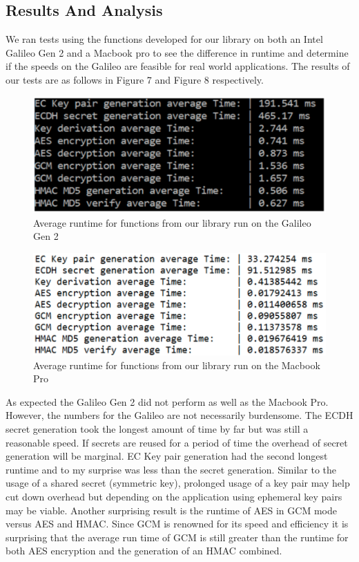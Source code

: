 \subsection{Results And Analysis}
	We ran tests using the functions developed for our library on both an Intel Galileo Gen 2 and a Macbook pro to see the difference in runtime and determine if the speeds on the Galileo are feasible for real world applications. The results of our tests are as follows in Figure 7 and Figure 8 respectively.

 \begin{figure}[t]
	\centering
	\includegraphics[width=12cm,height=0.7\textheight,keepaspectratio]{./figures/figure_7}
	\center\caption[font=footnote]{Average runtime for functions from our library run on the Galileo Gen 2}
\end{figure}

 \begin{figure}[t]
	\centering
	\includegraphics[width=12cm,height=0.7\textheight,keepaspectratio]{./figures/figure_8}
	\center\caption[font=footnote]{Average runtime for functions from our library run on the Macbook Pro}
\end{figure}


As expected the Galileo Gen 2 did not perform as well as the Macbook Pro. However, the numbers for the Galileo are not necessarily burdensome. The ECDH secret generation took the longest amount of time by far but was still a reasonable speed. If secrets are reused for a period of time the overhead of secret generation will be marginal. EC Key pair generation had the second longest runtime and to my surprise was less than the secret generation. Similar to the usage of a shared secret (symmetric key), prolonged usage of a key pair may help cut down overhead but depending on the application using ephemeral key pairs may be viable. Another surprising result is the runtime of AES in GCM mode versus AES and HMAC. Since GCM is renowned for its speed and efficiency it is surprising that the average run time of GCM is still greater than the runtime for both AES encryption and the generation of an HMAC combined.

